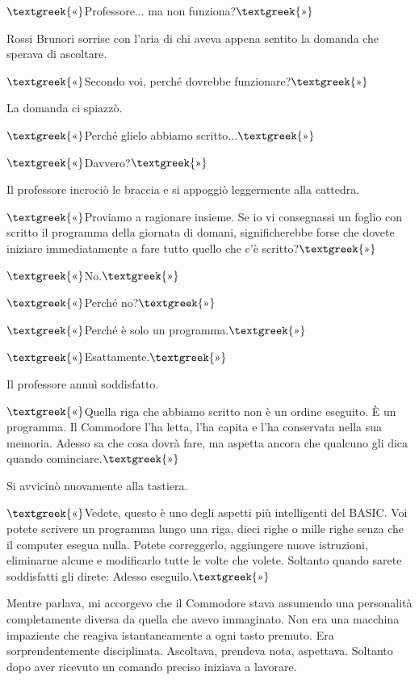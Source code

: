 \documentclass{article}
\begin{document}
$\text{\textgreek{«}}$Professore... ma non funziona?$\text{\textgreek{»}}$

Rossi Brunori sorrise con l'aria di chi aveva appena sentito la domanda che sperava di ascoltare.

$\text{\textgreek{«}}$Secondo voi, perché dovrebbe funzionare?$\text{\textgreek{»}}$

La domanda ci spiazzò.

$\text{\textgreek{«}}$Perché glielo abbiamo scritto...$\text{\textgreek{»}}$

$\text{\textgreek{«}}$Davvero?$\text{\textgreek{»}}$

Il professore incrociò le braccia e si appoggiò leggermente alla cattedra.

$\text{\textgreek{«}}$Proviamo a ragionare insieme. Se io vi consegnassi un foglio con scritto il programma della
giornata di domani, significherebbe forse che dovete iniziare immediatamente a fare tutto quello che c'è
scritto?$\text{\textgreek{»}}$

$\text{\textgreek{«}}$No.$\text{\textgreek{»}}$

$\text{\textgreek{«}}$Perché no?$\text{\textgreek{»}}$

$\text{\textgreek{«}}$Perché è solo un programma.$\text{\textgreek{»}}$

$\text{\textgreek{«}}$Esattamente.$\text{\textgreek{»}}$

Il professore annuì soddisfatto.

$\text{\textgreek{«}}$Quella riga che abbiamo scritto non è un ordine eseguito. È un programma. Il Commodore l'ha letta,
l'ha capita e l'ha conservata nella sua memoria. Adesso sa che cosa dovrà fare, ma aspetta ancora che qualcuno gli dica
quando cominciare.$\text{\textgreek{»}}$

Si avvicinò nuovamente alla tastiera.

$\text{\textgreek{«}}$Vedete, questo è uno degli aspetti più intelligenti del BASIC. Voi potete scrivere un programma
lungo una riga, dieci righe o mille righe senza che il computer esegua nulla. Potete correggerlo, aggiungere nuove
istruzioni, eliminarne alcune e modificarlo tutte le volte che volete. Soltanto quando sarete soddisfatti gli direte:
{\textquotedbl}Adesso eseguilo{\textquotedbl}.$\text{\textgreek{»}}$

Mentre parlava, mi accorgevo che il Commodore stava assumendo una personalità completamente diversa da quella che avevo
immaginato. Non era una macchina impaziente che reagiva istantaneamente a ogni tasto premuto. Era sorprendentemente
disciplinata. Ascoltava, prendeva nota, aspettava. Soltanto dopo aver ricevuto un comando preciso iniziava a lavorare.
\end{document}

